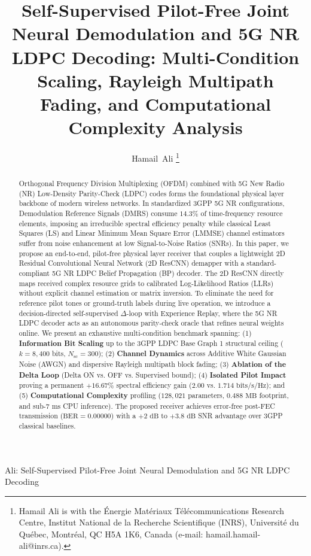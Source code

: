 \documentclass[journal]{IEEEtran}
\begin{document}
\title{Self-Supervised Pilot-Free Joint Neural Demodulation and 5G NR LDPC Decoding: Multi-Condition Scaling, Rayleigh Multipath Fading, and Computational Complexity Analysis}

\author{Hamail~Ali
\thanks{Hamail Ali is with the \'{E}nergie Mat\'{e}riaux T\'{e}l\'{e}communications Research Centre, Institut National de la Recherche Scientifique (INRS), Universit\'{e} du Qu\'{e}bec, Montr\'{e}al, QC H5A 1K6, Canada (e-mail: hamail.hamail-ali@inrs.ca).}%
}

%
{Ali: Self-Supervised Pilot-Free Joint Neural Demodulation and 5G NR LDPC Decoding}

\maketitle

\begin{abstract}
Orthogonal Frequency Division Multiplexing (OFDM) combined with 5G New Radio (NR) Low-Density Parity-Check (LDPC) codes forms the foundational physical layer backbone of modern wireless networks. In standardized 3GPP 5G NR configurations, Demodulation Reference Signals (DMRS) consume $14.3\%$ of time-frequency resource elements, imposing an irreducible spectral efficiency penalty while classical Least Squares (LS) and Linear Minimum Mean Square Error (LMMSE) channel estimators suffer from noise enhancement at low Signal-to-Noise Ratios (SNRs). In this paper, we propose an end-to-end, pilot-free physical layer receiver that couples a lightweight 2D Residual Convolutional Neural Network (2D ResCNN) demapper with a standard-compliant 5G NR LDPC Belief Propagation (BP) decoder. The 2D ResCNN directly maps received complex resource grids to calibrated Log-Likelihood Ratios (LLRs) without explicit channel estimation or matrix inversion. To eliminate the need for reference pilot tones or ground-truth labels during live operation, we introduce a decision-directed self-supervised $\Delta$-loop with Experience Replay, where the 5G NR LDPC decoder acts as an autonomous parity-check oracle that refines neural weights online. We present an exhaustive multi-condition benchmark spanning: (1) \textbf{Information Bit Scaling} up to the 3GPP LDPC Base Graph 1 structural ceiling ($k=8,400$ bits, $N_{\text{sc}}=300$); (2) \textbf{Channel Dynamics} across Additive White Gaussian Noise (AWGN) and dispersive Rayleigh multipath block fading; (3) \textbf{Ablation of the Delta Loop} (Delta ON vs. OFF vs. Supervised bound); (4) \textbf{Isolated Pilot Impact} proving a permanent $+16.67\%$ spectral efficiency gain ($2.00$ vs. $1.714\text{ bits/s/Hz}$); and (5) \textbf{Computational Complexity} profiling ($128,021$ parameters, $0.488\text{ MB}$ footprint, and sub-$7\text{ ms}$ CPU inference). The proposed receiver achieves error-free post-FEC transmission ($\text{BER}=0.00000$) with a $+2\text{ dB}$ to $+3.8\text{ dB}$ SNR advantage over 3GPP classical baselines.
\end{abstract}
\end{document}
